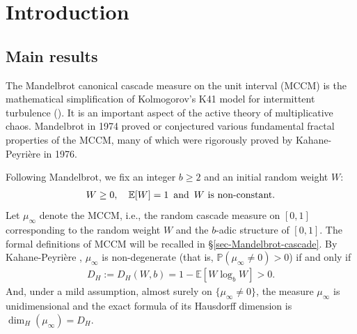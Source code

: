 \documentclass[12pt]{amsart}
\theoremstyle{definition}
\theoremstyle{remark}
\newcommand{\E}{\mathbb{E}}
\newcommand{\PP}{\mathbb{P}}
\newcommand{\an}{\text{\, and \,}}
\numberwithin{equation}{section}
\begin{document}

\maketitle

\setcounter{tocdepth}{2}
\tableofcontents

\setcounter{tocdepth}{0}
\setcounter{equation}{0}



\section{Introduction}\label{sec-intro}


\subsection{Main results}
The Mandelbrot canonical cascade measure on the unit interval (MCCM) is the mathematical simplification of Kolmogorov's K41 model for intermittent turbulence (\cite{M72, M74,M74-2}). It is an important aspect of the active theory of multiplicative chaos.    
Mandelbrot in 1974 \cite{M74-2}  proved or conjectured various fundamental fractal properties of the MCCM,   many of which were rigorously proved by  Kahane-Peyri\`ere  \cite{Kahane-Peyriere-advance}  in 1976.  



Following Mandelbrot,   we fix an integer $b\ge 2$ and an initial random weight $W$: 
\begin{align}\label{in-W}
 W\ge 0, \quad  \E[W]=1 \an \text{$W$ is non-constant}.
 \end{align}
Let  $\mu_\infty$ denote the MCCM, i.e., the random cascade measure on $[0,1]$ corresponding to the random weight $W$ and the $b$-adic structure of $[0,1]$. The formal definitions  of MCCM will be recalled in  \S \ref{sec-Mandelbrot-cascade}.  By  Kahane-Peyri\`ere  \cite{Kahane-Peyriere-advance}, $\mu_\infty$ is  non-degenerate  (that is, $\PP(\mu_\infty\ne 0) >0$) 
if and only if 
\begin{align}\label{H-dim}
D_H  := D_H(W, b) = 1- \E[W\log_b W]>0.
\end{align}
And,  under a mild assumption,  almost surely on $\{\mu_\infty\ne 0\}$,  the measure $\mu_\infty$ is unidimensional and the exact formula of its Hausdorff dimension is   $\dim_H(\mu_\infty)= D_H$. 
\end{document}
